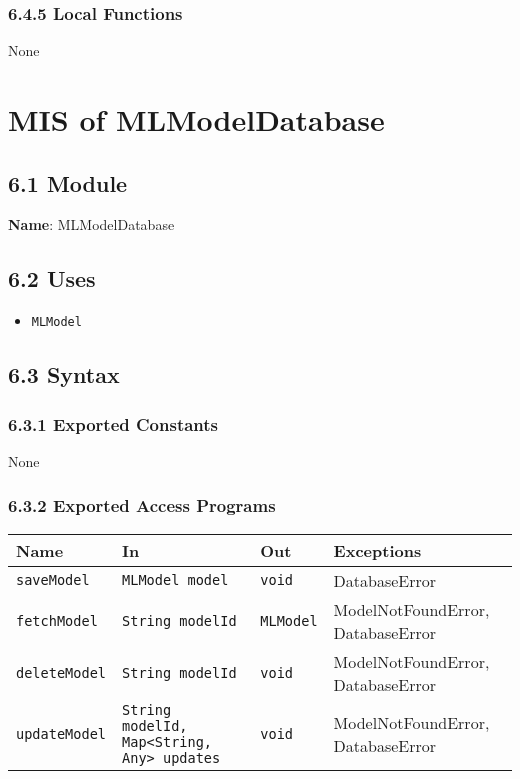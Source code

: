 \documentclass[12pt, titlepage]{article}
\begin{document}
\subsubsection{6.4.5 Local Functions}
None

\newpage


\section{MIS of MLModelDatabase}
\label{sec:MLModelDatabase}

\subsection{6.1 Module}
\textbf{Name}: MLModelDatabase

\subsection{6.2 Uses}
\begin{itemize}
    \item \texttt{MLModel}
\end{itemize}

\subsection{6.3 Syntax}

\subsubsection{6.3.1 Exported Constants}
None

\subsubsection{6.3.2 Exported Access Programs}
\begin{center}
\begin{tabular}{p{3.5cm} p{4.5cm} p{4cm} p{3cm}}
\hline
\textbf{Name} & \textbf{In} & \textbf{Out} & \textbf{Exceptions} \\
\hline
\texttt{saveModel} & \texttt{MLModel model} & \texttt{void} & DatabaseError \\
\hline
\texttt{fetchModel} & \texttt{String modelId} & \texttt{MLModel} & ModelNotFoundError, DatabaseError \\
\hline
\texttt{deleteModel} & \texttt{String modelId} & \texttt{void} & ModelNotFoundError, DatabaseError \\
\hline
\texttt{updateModel} & \texttt{String modelId, Map<String, Any> updates} & \texttt{void} & ModelNotFoundError, DatabaseError \\
\hline
\end{tabular}
\end{center}
\end{document}
